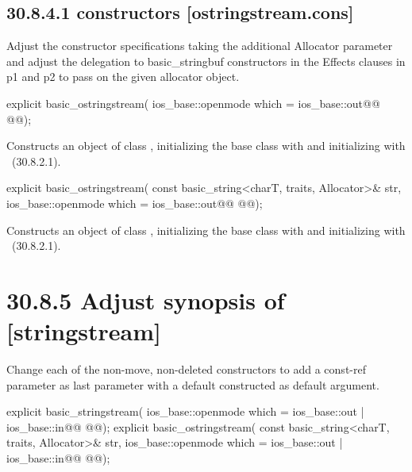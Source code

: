 \documentclass[ebook,11pt,article]{memoir}
\begin{document}
\subsection{30.8.4.1  constructors [ostringstream.cons]}
Adjust the constructor specifications taking the additional Allocator parameter and adjust the delegation to basic_stringbuf constructors in the Effects clauses in p1 and p2 to pass on the given allocator object.

\begin{itemdecl}
explicit basic_ostringstream(
  ios_base::openmode which = ios_base::out@\added{,}@
  @@);
\end{itemdecl}

\begin{itemdescr}
\pnum
\effects
Constructs an object of class
,
initializing the base class with
and initializing  with
~({30.8.2.1}).
\end{itemdescr}

\begin{itemdecl}
explicit basic_ostringstream(
  const basic_string<charT, traits, Allocator>& str,
  ios_base::openmode which = ios_base::out@\added{,}@
  @@);
\end{itemdecl}

\begin{itemdescr}
\pnum
\effects
Constructs an object of class
,
initializing the base class with
and initializing  with
~({30.8.2.1}).
\end{itemdescr}


\section{30.8.5 Adjust synopsis of  [stringstream]}
Change each of the non-move, non-deleted constructors to add a const-ref  parameter as last parameter with a default constructed  as default argument. 
\begin{codeblock}
explicit basic_stringstream(
             ios_base::openmode which = ios_base::out | ios_base::in@\added{,}@
             @@);
explicit basic_ostringstream(
             const basic_string<charT, traits, Allocator>& str,
             ios_base::openmode which = ios_base::out | ios_base::in@\added{,}@
             @@);
\end{codeblock}
\end{document}
